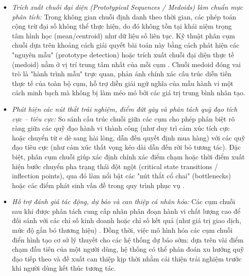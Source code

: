 \documentclass[../LuanVan.tex]{subfiles}
\begin{document}
\begin{itemize}
    \item \textit{Trích xuất chuỗi đại diện (Prototypical Sequences / Medoids) làm chuẩn mực phân tích:} Trong không gian chuỗi định danh theo thời gian, các phép toán cộng trừ đại số không thể thực hiện, do đó không tồn tại khái niệm trọng tâm hình học (mean/centroid) như dữ liệu số liên tục. Kỹ thuật phân cụm chuỗi dựa trên khoảng cách giải quyết bài toán này bằng cách phát hiện các "nguyên mẫu" (prototype detection) hoặc trích xuất chuỗi đại diện thực tế (medoid) nằm ở vị trí trung tâm nhất của mỗi cụm \cite{kaufman1990pam,kinjo2025analysis}. Chuỗi medoid đóng vai trò là "hành trình mẫu" trực quan, phản ánh chính xác cấu trúc diễn tiến thực tế của toàn bộ cụm, hỗ trợ diễn giải ngữ nghĩa của mẫu hành vi một cách minh bạch mà không bị làm méo mó bởi các giá trị trung bình nhân tạo.
    \item \textit{Phát hiện các nút thắt trải nghiệm, điểm đứt gãy và phân tách quỹ đạo tích cực -- tiêu cực:} So sánh cấu trúc chuỗi giữa các cụm cho phép phân biệt rõ ràng giữa các quỹ đạo hành vi thành công (như duy trì cảm xúc tích cực hoặc chuyển từ e dè sang hài lòng, dẫn đến quyết định mua hàng) với các quỹ đạo tiêu cực (như cảm xúc thất vọng kéo dài dẫn đến rời bỏ tương tác). Đặc biệt, phân cụm chuỗi giúp xác định chính xác điểm chạm hoặc thời điểm xuất hiện bước chuyển pha trạng thái đột ngột (critical state transitions / inflection points), qua đó làm nổi bật các "nút thắt cổ chai" (bottlenecks) hoặc các điểm phát sinh vấn đề trong quy trình phục vụ \cite{kinjo2025analysis}.
    \item \textit{Hỗ trợ đánh giá tác động, dự báo và can thiệp cá nhân hóa:} Các cụm chuỗi sau khi được phân tách cung cấp nhãn phân đoạn hành vi chất lượng cao để đối sánh với các chỉ số kinh doanh hoặc chỉ số kết quả (như giá trị giao dịch, mức độ gắn bó thương hiệu) \cite{john2023exploration}. Đồng thời, việc mô hình hóa các cụm chuỗi điển hình tạo cơ sở lý thuyết cho các hệ thống dự báo sớm: dựa trên vài điểm chạm đầu tiên của một người dùng, hệ thống có thể phán đoán xu hướng quỹ đạo tiếp theo và đề xuất can thiệp kịp thời nhằm cải thiện trải nghiệm trước khi người dùng kết thúc tương tác.
\end{itemize}
\end{document}
